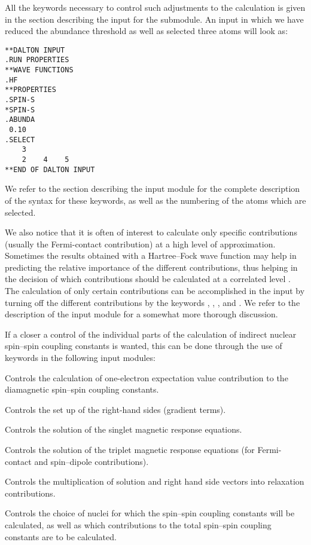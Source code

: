 All the keywords necessary to control such adjustments to the
calculation is given in the section describing the input for the
 submodule. An input
in which we  have reduced the abundance threshold as well as
selected three atoms will look as:

\begin{verbatim}
**DALTON INPUT
.RUN PROPERTIES
**WAVE FUNCTIONS
.HF
**PROPERTIES
.SPIN-S
*SPIN-S
.ABUNDA
 0.10
.SELECT
    3
    2    4    5
**END OF DALTON INPUT
\end{verbatim}

We refer to the section describing the  input module for
the complete description of the syntax for these keywords, as well as
the numbering of the atoms which are selected.

We also notice that it is often of interest to calculate only specific
contributions (usually the Fermi-contact contribution) at a high level
of approximation. Sometimes the results obtained with a Hartree--Fock
wave function may help in predicting the relative importance of the different
contributions, thus helping in the decision of which contributions
should be calculated at a correlated level \cite{krthklbpjcpl226}.
The calculation of only certain contributions can be accomplished in
the input by turning off the different
contributions by the keywords , ,
, and . We refer to the description of the
 input module for a somewhat more thorough discussion.

If a closer a control of the individual parts of the calculation of
indirect nuclear spin--spin coupling constants is wanted, this can be
done through the use of keywords in the following input modules:

\begin{list}{}{\itemsep 0.10cm \parsep 0.0cm}
\item[\Sec{EXPECT}] Controls the calculation of one-electron
expectation value contribution to the diamagnetic spin--spin coupling
constants.
\item[\Sec{GETSGY}] Controls the set up of the right-hand sides
(gradient terms).
\item[\Sec{LINRES}] Controls the solution of the singlet magnetic
response equations.
\item[\Sec{TRPRSP}] Controls the solution of the triplet magnetic
response equations (for Fermi-contact and spin--dipole contributions).
\item[\Sec{RELAX}] Controls the multiplication of solution and right hand
side vectors into relaxation contributions.
\item[\Sec{SPIN-S}] Controls the choice of nuclei for which the
spin--spin coupling constants will be calculated, as well as which
contributions to the total spin--spin coupling constants are to be
calculated.
\end{list}

